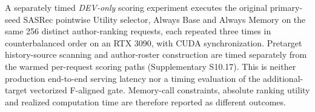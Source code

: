 A separately timed \emph{DEV-only} scoring experiment executes the original primary-seed SASRec pointwise Utility selector, Always Base and Always Memory on the same 256 distinct author-ranking requests, each repeated three times in counterbalanced order on an RTX 3090, with CUDA synchronization. Pretarget history-source scanning and author-roster construction are timed separately from the warmed per-request scoring paths (Supplementary S10.17). This is neither production end-to-end serving latency nor a timing evaluation of the additional-target vectorized F-aligned gate. Memory-call constraints, absolute ranking utility and realized computation time are therefore reported as different outcomes.

